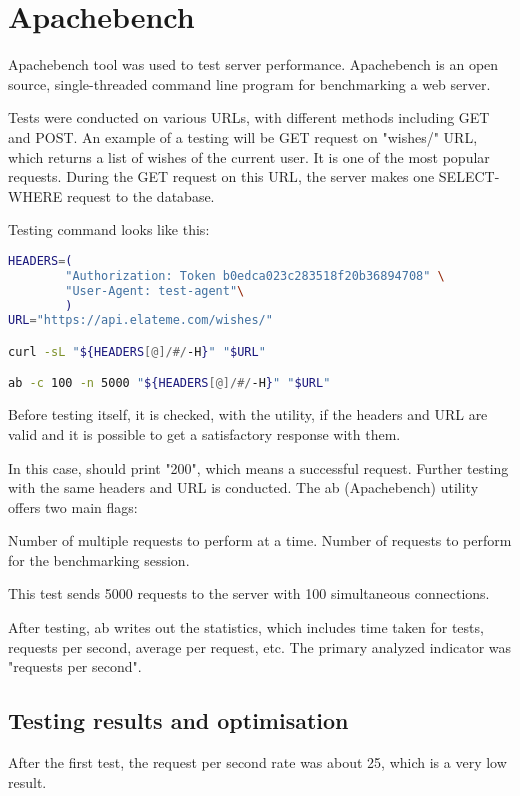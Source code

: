 \newcommand{\bnitem}[1]{
\item\textbf{#1}.}
\section{Apachebench}
Apachebench tool was used to test server performance. Apachebench is an open source, single-threaded command line program for benchmarking a web server.

Tests were conducted on various \ac{URL}s, with different methods including GET and POST. An example of a testing will be GET request on "wishes/" \ac{URL}, which returns a list of wishes of the current user. It is one of the most popular requests. During the GET request on this \ac{URL}, the server makes one SELECT-WHERE request to the database.

Testing command looks like this:

\begin{lstlisting}[language=bash]
HEADERS=(
        "Authorization: Token b0edca023c283518f20b36894708" \
        "User-Agent: test-agent"\
        )
URL="https://api.elateme.com/wishes/"

curl -sL "${HEADERS[@]/#/-H}" "$URL"

ab -c 100 -n 5000 "${HEADERS[@]/#/-H}" "$URL"
\end{lstlisting}
Before testing itself, it is checked, with the  utility, if the headers and \ac{URL} are valid and it is possible to get a satisfactory response with them.

In this case, \bash{curl} should print "200", which means a successful request. Further testing with the same headers and \ac{URL} is conducted. The ab (Apachebench) utility offers two main flags:

\begin{itemize}
 Number of multiple requests to perform at a time.
\flag{n} Number of requests to perform for the benchmarking session.
\end{itemize}

This test sends 5000 requests to the server with 100 simultaneous connections.

After testing, ab writes out the statistics, which includes time taken for tests, requests per second, average per request, etc. The primary analyzed indicator was "requests per second".

\subsection{Testing results and optimisation}
After the first test, the request per second rate was about 25, which is a very low result.

